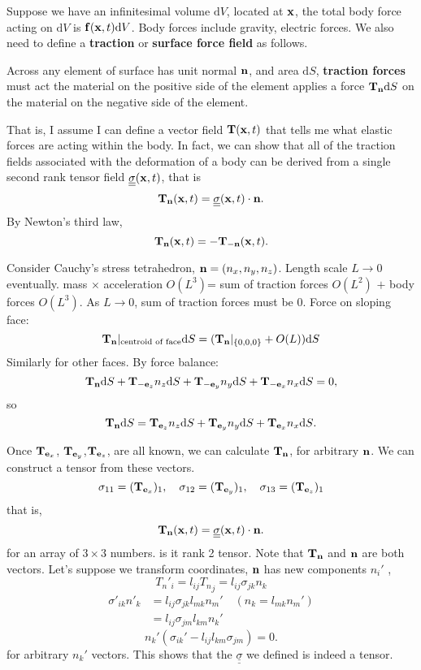 \documentclass[12pt]{article}
\newcommand{\xx}{{\bf x}}
\newcommand{\ee}{{\bf e}}
\newcommand{\ff}{{\bf f}}
\newcommand{\nn}{{\bf n}}
\newcommand{\bT}{{\bf T}}
\newcommand{\ssigma}{{\underline{\underline \sigma}}}
\newcommand{\dV}{{\text{d}V}}
\newcommand{\dS}{{\text{d}S}}
\begin{document}
Suppose we have an infinitesimal volume $\dV$, located at $\xx$, the total body force acting on $\dV$ is $\ff(\xx,t)\dV$. Body forces include gravity, electric forces. We also need to define a {\bf traction} or {\bf surface force field} as follows. 

Across any element of surface has unit normal $\nn$, and area $\dS$,  {\bf traction forces} must act the material on the positive side of the element applies a force $\bT_{\nn}\dS$ on the material on the negative side of the element.

That is, I assume I can define a vector field $\bT(\xx, t)$ that tells me what elastic forces are acting within the body. In fact, we can show that all of the traction fields associated with the deformation of a body can be derived from a single second rank tensor field $\ssigma(\xx,t)$, that is
\[
\bT_{\nn}(\xx,t) = \ssigma(\xx,t)\cdot \nn .
\]
By Newton's third law,
\[
\bT_{\nn}(\xx,t) = -\bT_{-\nn}(\xx,t).
\]

Consider Cauchy's stress tetrahedron, $\nn = (n_x, n_y, n_z)$. Length scale $L\to 0$ eventually.
mass $\times$ acceleration $O(L^3)$= sum of traction forces $O(L^2)$ $+$ body forces $O(L^3)$. As $L\to 0$, sum of traction forces must be 0.  Force on sloping face:
\[
\bT_{\nn}\rvert_ {\text {centroid of face}}\dS = (\bT_{\nn}\rvert_{\{0,0,0\}}+ O(L))\dS 
\]
Similarly for other faces. By force balance:
\[
\bT_{\nn}\dS + \bT_{-\ee_z}n_z\dS +\bT_{-\ee_y}n_y\dS +\bT_{-\ee_x}n_x\dS = 0,
\]
so 
\[
\bT_{\nn}\dS = \bT_{\ee_z}n_z\dS +\bT_{\ee_y}n_y\dS +\bT_{\ee_x}n_x\dS .
\]

Once $\bT_{\ee_x}$, $\bT_{\ee_y}$,$\bT_{\ee_z}$, are all known, we can calculate $\bT_{\nn}$, for arbitrary $\nn$. We can construct a tensor from these vectors.
\[
\sigma_{11} = (\bT_{\ee_x})_1, \quad \sigma_{12} = (\bT_{\ee_y})_1,\quad \sigma_{13} = (\bT_{\ee_z})_1
\]
that is, 
\[
\bT_{\nn}(\xx,t) = \ssigma(\xx,t)\cdot \nn .
\]
for an array of $3\times 3$ numbers. is it  rank 2 tensor.
Note that $\bT_{\nn}$ and $\nn$ are both vectors. Let's suppose we transform coordinates, $\nn$ has new components $n_i'$ ,
\[
{T_{n}}'_i = l_{ij} {T_{n}}_j = l_{ij} \sigma_{jk}n_k
\]
\begin{align*}
\sigma'_{ik}n'_k &=  l_{ij} \sigma_{jk} l_{mk}n_m' \quad (n_k = l_{mk}n_m')\\
&=   l_{ij} \sigma_{jm} l_{km}n_k' 
\end{align*}
\[
n_k'(\sigma_{ik}' - l_{ij}l_{km}\sigma_{jm})=0.
\]
for arbitrary $n_k'$ vectors. This shows that the $\ssigma$ we defined is indeed a tensor.
\end{document}
